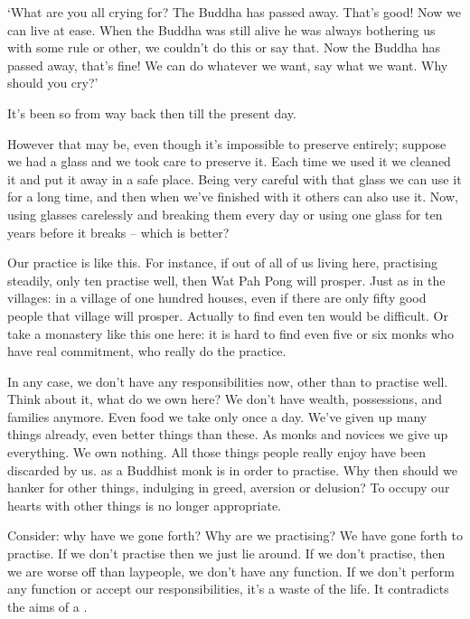 `What are you all crying for? The Buddha has passed away. That's good! Now we can live at ease. When the Buddha was still alive he was always bothering us with some rule or other, we couldn't do this or say that. Now the Buddha has passed away, that's fine! We can do whatever we want, say what we want. Why should you cry?'

It's been so from way back then till the present day.

However that may be, even though it's impossible to preserve entirely; suppose we had a glass and we took care to preserve it. Each time we used it we cleaned it and put it away in a safe place. Being very careful with that glass we can use it for a long time, and then when we've finished with it others can also use it. Now, using glasses carelessly and breaking them every day or using one glass for ten years before it breaks -- which is better?

Our practice is like this. For instance, if out of all of us living here, practising steadily, only ten practise well, then Wat Pah Pong will prosper. Just as in the villages: in a village of one hundred houses, even if there are only fifty good people that village will prosper. Actually to find even ten would be difficult. Or take a monastery like this one here: it is hard to find even five or six monks who have real commitment, who really do the practice.

In any case, we don't have any responsibilities now, other than to practise well. Think about it, what do we own here? We don't have wealth, possessions, and families anymore. Even food we take only once a day. We've given up many things already, even better things than these. As monks and novices we give up everything. We own nothing. All those things people really enjoy have been discarded by us.  as a Buddhist monk is in order to practise. Why then should we hanker for other things, indulging in greed, aversion or delusion? To occupy our hearts with other things is no longer appropriate.

Consider: why have we gone forth? Why are we practising? We have gone forth to practise. If we don't practise then we just lie around. If we don't practise, then we are worse off than laypeople, we don't have any function. If we don't perform any function or accept our responsibilities, it's a waste of the  life. It contradicts the aims of a .

